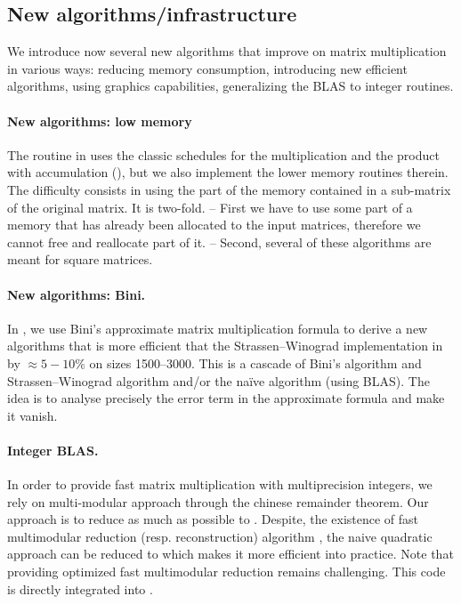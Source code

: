\subsection{New algorithms/infrastructure}
%
We introduce now several new algorithms that improve on matrix multiplication
in various ways: reducing memory consumption, introducing new efficient
algorithms, using graphics capabilities, generalizing the BLAS to integer
routines.
%
\paragraph{New algorithms: low memory}
%
The routine \fgemm in \fflas uses the classic schedules for the multiplication and
the product with accumulation (\cf \cite{Boyer:2009:sched}), but we also
implement the lower memory routines therein.
%
%
The difficulty consists in using the part of the memory contained in a
sub-matrix of the original matrix. It is two-fold. -- First we have to use some
part of a memory that has already been allocated to the input matrices,
therefore we cannot free and reallocate part of it. -- Second, several of these
algorithms are meant for square matrices.
%
%
%
\paragraph{New algorithms: Bini.}
%
In \cite{BD:2014:Bini}, we use Bini's approximate matrix multiplication formula
to derive a new algorithms that is more efficient that the Strassen--Winograd
implementation in \fgemm by $\approx 5-10\%$ on sizes \num{1500}--\num{3000}.
This is a cascade of Bini's algorithm and Strassen--Winograd algorithm and/or
the naïve algorithm (using BLAS). The idea is to analyse precisely the error
term in the approximate formula and make it vanish.
%
\paragraph{Integer BLAS.}
%
In order to provide fast matrix multiplication with multiprecision integers, we rely on multi-modular approach through the chinese remainder theorem. Our approach is to reduce as much as possible to \fgemm. Despite, the existence of fast multimodular reduction (resp. reconstruction) algorithm \cite{VonzurGathen:1999:MCA}, 
the naive quadratic approach can be reduced to \fgemm which makes it more efficient into practice. 
Note that providing optimized fast multimodular reduction remains challenging. This code is directly integrated  into \fflas.

